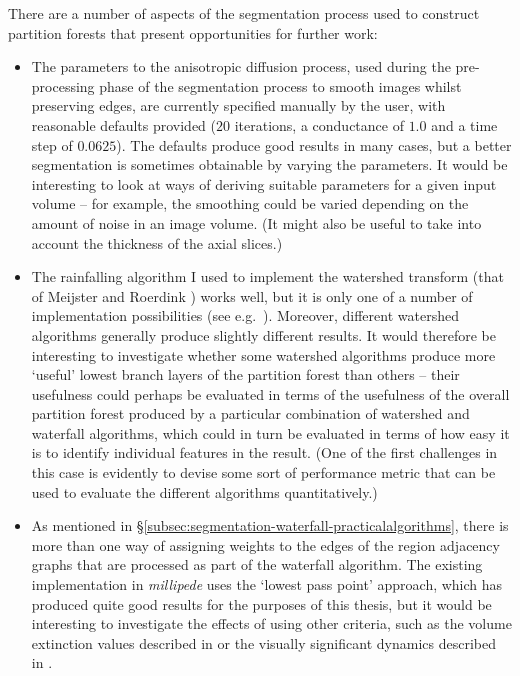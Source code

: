 There are a number of aspects of the segmentation process used to construct partition forests that present opportunities for further work:
%
\begin{itemize}

\item The parameters to the anisotropic diffusion process, used during the pre-processing phase of the segmentation process to smooth images whilst preserving edges, are currently specified manually by the user, with reasonable defaults provided ($20$ iterations, a conductance of $1.0$ and a time step of $0.0625$). The defaults produce good results in many cases, but a better segmentation is sometimes obtainable by varying the parameters. It would be interesting to look at ways of deriving suitable parameters for a given input volume -- for example, the smoothing could be varied depending on the amount of noise in an image volume. (It might also be useful to take into account the thickness of the axial slices.)

\item The rainfalling algorithm I used to implement the watershed transform (that of Meijster and Roerdink \cite{meijster98}) works well, but it is only one of a number of implementation possibilities (see e.g.~\cite{roerdink01}). Moreover, different watershed algorithms generally produce slightly different results. It would therefore be interesting to investigate whether some watershed algorithms produce more `useful' lowest branch layers of the partition forest than others -- their usefulness could perhaps be evaluated in terms of the usefulness of the overall partition forest produced by a particular combination of watershed and waterfall algorithms, which could in turn be evaluated in terms of how easy it is to identify individual features in the result. (One of the first challenges in this case is evidently to devise some sort of performance metric that can be used to evaluate the different algorithms quantitatively.)


\item As mentioned in \S\ref{subsec:segmentation-waterfall-practicalalgorithms}, there is more than one way of assigning weights to the edges of the region adjacency graphs that are processed as part of the waterfall algorithm. The existing implementation in \emph{millipede} uses the `lowest pass point' approach, which has produced quite good results for the purposes of this thesis, but it would be interesting to investigate the effects of using other criteria, such as the volume extinction values described in \cite{vachier95} or the visually significant dynamics described in \cite{climent06}.

\end{itemize}

